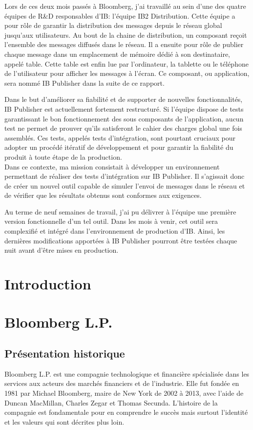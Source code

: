 \documentclass[11pt, oneside, titlepage, a4paper]{article}
\begin{document}
\begin{small}
Lors de ces deux mois passés à Bloomberg, j'ai travaillé au sein d'une des quatre équipes de R\&D responsables d'IB: l'équipe IB2 Distribution. Cette équipe a pour rôle de garantir la distribution des messages depuis le réseau global jusqu'aux utilisateurs. Au bout de la chaine de distribution, un composant reçoit l'ensemble des messages diffusés dans le réseau. Il a ensuite pour rôle de publier chaque message dans un emplacement de mémoire dédié à son destinataire, appelé table. Cette table est enfin lue par l'ordinateur, la tablette ou le téléphone de l'utilisateur pour afficher les messages à l'écran. Ce composant, ou application, sera nommé IB Publisher dans la suite de ce rapport.

Dans le but d'améliorer sa fiabilité et de supporter de nouvelles fonctionnalités, IB Publisher est actuellement fortement restructuré. Si l'équipe dispose de tests garantissant le bon fonctionnement des sous composants de l'application, aucun test ne permet de prouver qu'ils satisferont le cahier des charges global une fois assemblés. Ces tests, appelés tests d'intégration, sont pourtant cruciaux pour adopter un procédé itératif de développement et pour garantir la fiabilité du produit à toute étape de la production.
\\

Dans ce contexte, ma mission consistait à développer un environnement permettant de réaliser des tests d'intégration sur IB Publisher. Il s'agissait donc de créer un nouvel outil capable de simuler l'envoi de messages dans le réseau et de vérifier que les résultats obtenus sont conformes aux exigences.

Au terme de neuf semaines de travail, j'ai pu délivrer à l'équipe une première version fonctionnelle d'un tel outil. Dans les mois à venir, cet outil sera complexifié et intégré dans l'environnement de production d'IB. Ainsi, les dernières modifications apportées à IB Publisher pourront être testées chaque nuit avant d'être mises en production.
\end{small}
\newpage
\tableofcontents
\newpage
\section{Introduction}
\newpage
\section{Bloomberg L.P.}
	\subsection{Présentation historique}
Bloomberg L.P. est une compagnie technologique et financière spécialisée dans les services aux acteurs des marchés financiers et de l'industrie. Elle fut fondée en 1981 par Michael Bloomberg, maire de New York de 2002 à 2013, avec l'aide de Duncan MacMillan, Charles Zegar et Thomas Secunda. L'histoire de la compagnie est fondamentale pour en comprendre le succès mais surtout l'identité et les valeurs qui sont décrites plus loin.
\end{document}
